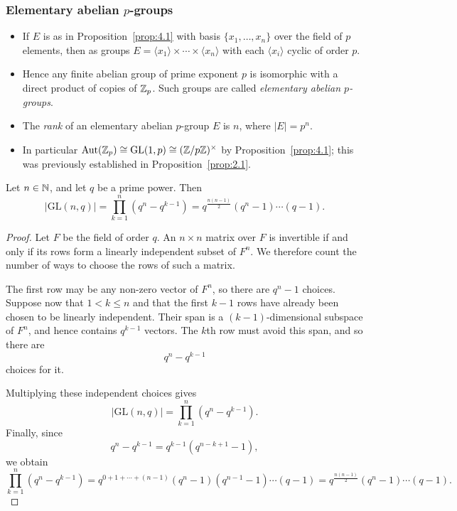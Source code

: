 \documentclass[../Odyssey_Project.tex]{subfiles}
\begin{document}
\subsubsection*{Elementary abelian \texorpdfstring{$p$}{p}-groups}
\begin{itemize}
    \item If $E$ is as in Proposition~\ref{prop:4.1} with basis $\{x_1, \ldots, x_n\}$ over the field of $p$ elements, then as groups $E = \langle x_1 \rangle \times \cdots \times \langle x_n \rangle$ with each $\langle x_i \rangle$ cyclic of order $p$.
    \item Hence any finite abelian group of prime exponent $p$ is isomorphic with a direct product of copies of $\mathbb{Z}_p$. Such groups are called \emph{elementary abelian $p$-groups}.
    \item The \emph{rank} of an elementary abelian $p$-group $E$ is $n$, where $|E| = p^n$.
    \item In particular $\mathrm{Aut}(\mathbb{Z}_p) \cong \mathrm{GL}(1, p) \cong (\mathbb{Z}/p\mathbb{Z})^\times$ by Proposition~\ref{prop:4.1}; this was previously established in Proposition~\ref{prop:2.1}.
\end{itemize}

\begin{proposition}
\label{prop:4.2}
Let $n \in \mathbb{N}$, and let $q$ be a prime power. Then
\[
|\mathrm{GL}(n, q)| = \prod_{k=1}^n (q^n - q^{k-1}) = q^{\frac{n(n-1)}{2}} (q^n - 1) \cdots (q - 1).
\]
\end{proposition}

\begin{proof}
Let $F$ be the field of order $q$. An $n \times n$ matrix over $F$ is invertible if and only if its rows form a linearly independent subset of $F^n$. We therefore count the number of ways to choose the rows of such a matrix.

The first row may be any non-zero vector of $F^n$, so there are $q^n - 1$ choices. Suppose now that $1 < k \leq n$ and that the first $k-1$ rows have already been chosen to be linearly independent. Their span is a $(k-1)$-dimensional subspace of $F^n$, and hence contains $q^{k-1}$ vectors. The $k$th row must avoid this span, and so there are
\[
    q^n - q^{k-1}
\]
choices for it.

Multiplying these independent choices gives
\[
    |\mathrm{GL}(n,q)| = \prod_{k=1}^n (q^n - q^{k-1}).
\]
Finally, since
\[
    q^n - q^{k-1} = q^{k-1}(q^{n-k+1}-1),
\]
we obtain
\[
    \prod_{k=1}^n (q^n - q^{k-1})
    = q^{0+1+\cdots+(n-1)}(q^n-1)(q^{n-1}-1)\cdots(q-1)
    = q^{\frac{n(n-1)}{2}}(q^n-1)\cdots(q-1).
\]
\end{proof}
\end{document}
